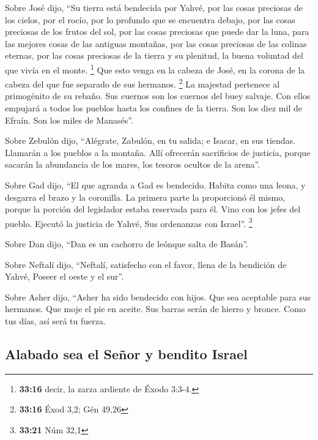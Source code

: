  Sobre José dijo, ``Su tierra está bendecida por Yahvé,
por las cosas preciosas de los cielos, por el rocío, por lo profundo que
se encuentra debajo,  por las cosas preciosas de los
frutos del sol, por las cosas preciosas que puede dar la luna,
 para las mejores cosas de las antiguas montañas, por las
cosas preciosas de las colinas eternas,  por las cosas
preciosas de la tierra y su plenitud, la buena voluntad del que vivía en
el monte. \footnote{\textbf{33:16} decir, la zarza ardiente de Éxodo
  3:3-4.} Que esto venga en la cabeza de José, en la corona de la cabeza
del que fue separado de sus hermanos. \footnote{\textbf{33:16} Éxod 3,2;
  Gén 49,26}  La majestad pertenece al primogénito de su
rebaño. Sus cuernos son los cuernos del buey salvaje. Con ellos empujará
a todos los pueblos hasta los confines de la tierra. Son los diez mil de
Efraín. Son los miles de Manasés''.

 Sobre Zebulón dijo, ``Alégrate, Zabulón, en tu salida; e
Isacar, en sus tiendas.  Llamarán a los pueblos a la
montaña. Allí ofrecerán sacrificios de justicia, porque sacarán la
abundancia de los mares, los tesoros ocultos de la arena''.

 Sobre Gad dijo, ``El que agranda a Gad es bendecido.
Habita como una leona, y desgarra el brazo y la coronilla.
 La primera parte la proporcionó él mismo, porque la
porción del legislador estaba reservada para él. Vino con los jefes del
pueblo. Ejecutó la justicia de Yahvé, Sus ordenanzas con Israel''.
\footnote{\textbf{33:21} Núm 32,1}

 Sobre Dan dijo, ``Dan es un cachorro de leónque salta de
Basán''.

 Sobre Neftalí dijo, ``Neftalí, satisfecho con el favor,
llena de la bendición de Yahvé, Poseer el oeste y el sur''.

 Sobre Asher dijo, ``Asher ha sido bendecido con hijos.
Que sea aceptable para sus hermanos. Que moje el pie en aceite.
 Sus barras serán de hierro y bronce. Como tus días, así
será tu fuerza.

\hypertarget{alabado-sea-el-seuxf1or-y-bendito-israel}{%
\subsection{Alabado sea el Señor y bendito
Israel}\label{alabado-sea-el-seuxf1or-y-bendito-israel}}

